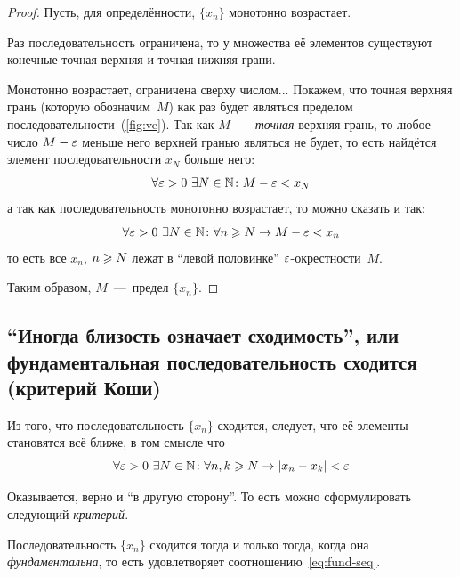 \documentclass[a4paper,12pt]{article}
\begin{document}
  \begin{proof}
    Пусть, для определённости, $\{x_n\}$ монотонно возрастает.
    
    Раз последовательность ограничена, то у множества её элементов существуют конечные точная верхняя и точная нижняя грани.
    
    Монотонно возрастает, ограничена сверху числом...
    Покажем, что точная верхняя грань (которую обозначим~$M$) как раз будет являться пределом последовательности~(\ref{fig:ve}).
    Так как $M$~---~\emph{точная} верхняя грань, то любое число $M \hm- \eps$ меньше него верхней гранью являться не будет, то есть найдётся элемент последовательности $x_N$ больше него:
    \[
      \forall \varepsilon > 0\ \exists N \in \mathbb N\colon M - \varepsilon < x_N
    \]
    а так как последовательность монотонно возрастает, то можно сказать и так:
    \[
      \forall \varepsilon > 0\ \exists N \in \mathbb N\colon \forall n \geqslant N \to M - \varepsilon < x_n
    \]
    то есть все $x_n$, $n \hm\geq N$ лежат в ``левой половинке'' $\varepsilon$-окрестности~$M$.
    
    Таким образом, $M$~---~предел $\{x_n\}$.
  \end{proof}
  
  
  \subsection{``Иногда близость означает сходимость'', или фундаментальная последовательность сходится (критерий Коши)}
  
  Из того, что последовательность $\{x_n\}$ сходится, следует, что её элементы становятся всё ближе, в том смысле что
  \begin{equation}\label{eq:fund-seq}
    \forall \varepsilon > 0\ \exists N \in \mathbb N\colon \forall n, k \geqslant N \to |x_n - x_k| < \varepsilon
  \end{equation}
  
  Оказывается, верно и ``в другую сторону''.
  То есть можно сформулировать следующий \emph{критерий}.
  
  \begin{proposition}
    Последовательность $\{x_n\}$ сходится тогда и только тогда, когда она \emph{фундаментальна}, то есть удовлетворяет соотношению~\eqref{eq:fund-seq}.
  \end{proposition}
  
\end{document}
